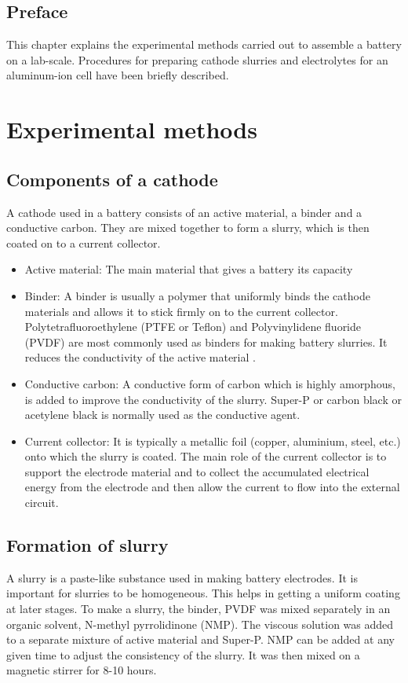 \section*{\centering Preface}
This chapter explains the experimental methods carried out to assemble a battery on a lab-scale. Procedures for preparing cathode slurries and electrolytes for an aluminum-ion cell have been briefly described. 
\pagebreak
\chapter{Experimental methods} %

\label{chap3} %

\section{Components of a cathode}
A cathode used in a battery consists of an active material, a binder and a conductive carbon. They are mixed together to form a slurry, which is then coated on to a current collector.  
\begin{itemize}
    \item Active material: The main material that gives a battery its capacity
    \item Binder: A binder is usually a polymer that uniformly binds the cathode materials and allows it to stick firmly on to the current collector. Polytetrafluoroethylene (PTFE or Teflon) and Polyvinylidene fluoride (PVDF) are most commonly used as binders for making battery slurries. It reduces the conductivity of the active  material \cite{grillet_conductivity_2016}. 
    \item Conductive carbon: A conductive form of carbon which is highly amorphous, is added to improve the conductivity of the slurry. Super-P or carbon black or acetylene black is normally used as the conductive agent. 
    \item Current collector: It is typically a metallic foil (copper, aluminium, steel, etc.) onto which the slurry is coated. The main role of the current collector is to support the electrode material and to collect the accumulated electrical energy from the electrode and then allow the current to flow into the external circuit\cite{sun_effect_2017}.
\end{itemize}

\section{Formation of slurry}
A slurry is a paste-like substance used in making battery electrodes. It is important for slurries to be homogeneous. This helps in getting a uniform coating at later stages. To make a slurry, the binder, PVDF was mixed separately in an organic solvent, N-methyl pyrrolidinone (NMP). The viscous solution was added to a separate mixture of active material and Super-P. NMP can be added at any given time to adjust the consistency of the slurry. It was then mixed on a magnetic stirrer for 8-10 hours. 


